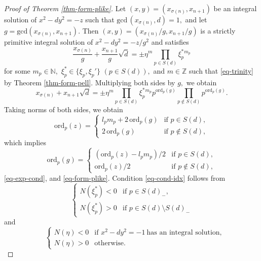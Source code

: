 \documentclass{article}
\theoremstyle{definition}
\theoremstyle{plain}
\newenvironment{pf}{\begin{proof}}{\end{proof}}
\begin{document}
\begin{pf}[Proof of Theorem \ref{thm-form-plike}]
Let $(x,y) = (x_{\sigma (n)},x_{n+1})$ be an integral solution of $x^2-dy^2 = -z$ such that $\mathrm{gcd}\,(x_{\sigma (n)},d) = 1,$ and let $g = \mathrm{gcd}(x_{\sigma (n)},x_{n+1}).$ 
Then $(x,y) = (x_{\sigma (n)}/g,x_{n+1}/g)$ is a strictly primitive integral solution of $x^2-dy^2 = -z/g^2$ and satisfies 
\[\frac{x_{\sigma (n)}}{g}+\frac{x_{n+1}}{g}\sqrt d = \pm\eta ^m\prod_{p \in S(d)}\xi _p^*{}^{m_p}\] 
for some $m_p \in \mathbb N,$ $\xi _p^* \in \{\xi _p,\xi _p{}'\}$ $(p \in S(d)),$ and $m \in \mathbb Z$ such that \eqref{eq-trinity} by Theorem \ref{thm-form-pell}. 
Multiplying both sides by $g,$ we obtain 
\[ x_{\sigma (n)}+x_{n+1}\sqrt d = \pm\eta ^m\prod_{p \in S(d)}\xi _p^*{}^{m_p}p^{\mathrm{ord}_p(g)}\prod_{p \notin S(d)}p^{\mathrm{ord}_p(g)}.\] 
Taking norms of both sides, we obtain 
\[\mathrm{ord}_p(z) = \begin{cases} 
l_pm_p+2\,\mathrm{ord}_p(g) & \text{if }p \in S(d), \\ 
2\,\mathrm{ord}_p(g) & \text{if }p \notin S(d), 
\end{cases}\] 
which implies 
\[\mathrm{ord}_p(g) = \begin{cases} 
(\mathrm{ord}_p(z)-l_pm_p)/2 & \text{if }p \in S(d), \\ 
\mathrm{ord}_p(z)/2 & \text{if }p \notin S(d), 
\end{cases}\] 
\eqref{eq-exp-cond}, and \eqref{eq-form-plike}. 
Condition \eqref{eq-cond-idx} follows from 
\[\begin{cases} 
N(\xi _p^*) < 0 & \text{if }p \in S(d)_-, \\ 
N(\xi _p^*) > 0 & \text{if }p \in S(d)\setminus S(d)_- 
\end{cases}\] 
and 
\[\quad \begin{cases} 
N(\eta ) < 0 & \text{if }x^2-dy^2 = -1\ \text{has an integral solution}, \\ 
N(\eta ) > 0 & \text{otherwise}. 
\end{cases}\] 
\end{pf}
\end{document}
